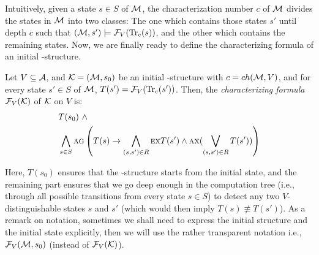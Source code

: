 \documentclass{article}
\begin{document}



Intuitively, given a state $s \in S$ of ${\cal M}$, the characterization number $c$ of ${\cal M}$ divides the states in ${\cal M}$ into two classes: The one which contains those states $s'$ until depth $c$ such that $({\cal M},s') \models {\cal F}_V(\textrm{Tr}_c(s))$, and the other which contains the remaining states. Now, we are finally ready to define the characterizing formula of an  initial \MPK-structure.
\begin{definition}
Let $V\subseteq\cal A$,
 and ${\cal K}=({\cal M},s_0)$ be an initial \MPK-structure with $c=ch({\cal M},V)$, and for every state $s' \in S$ of ${\cal M}$, $T(s') = {\cal F}_V(\textrm{Tr}_c(s'))$.
Then, the {\em characterizing formula} ${\cal F}_V({\cal K})$ of $\cal K$ on $V$ is:
\begin{align*}
  &T(s_0) \text{ } \wedge \\
  & \bigwedge_{s\in S}\textsc{a} \textsc{g}\left(
    T(s) \rightarrow
    \bigwedge_{(s,s')\in R}
        \textsc{e} \textsc{x} T(s')
        \wedge
        \textsc{a} \textsc{x} (\bigvee_{(s,s')\in R}T(s'))
    \right)
\end{align*}
\end{definition}
Here, $T(s_0)$ ensures that the \MPK-structure starts from the initial state, and the remaining part ensures that we go deep enough in the computation tree (i.e., through all possible transitions from every state $s \in S$)  to detect any two  $V$-distinguishable states $s$ and $s'$ (which would then imply  $T(s) \not \equiv T(s')$). As a remark on notation, sometimes  we shall need to express the initial structure and the initial state explicitly, then we will use the rather transparent notation i.e., ${\cal F}_V({\cal M}, s_0)$ (instead of ${\cal F}_V({\cal K})$).  %
\end{document}
